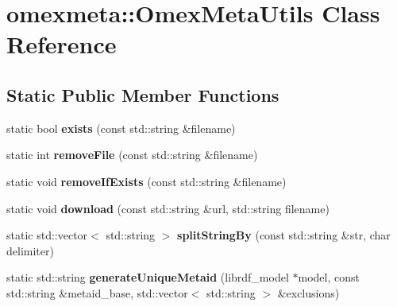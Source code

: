 \hypertarget{classomexmeta_1_1OmexMetaUtils}{}\section{omexmeta\+:\+:Omex\+Meta\+Utils Class Reference}
\label{classomexmeta_1_1OmexMetaUtils}
\subsection*{Static Public Member Functions}
\begin{DoxyCompactItemize}
\item 
\mbox{\label{classomexmeta_1_1OmexMetaUtils_ab72b362607e6bbdd0025eefa574cd073}} 
static bool {\bfseries exists} (const std\+::string \&filename)
\item 
\mbox{\label{classomexmeta_1_1OmexMetaUtils_a9c445a8e0cc6589b25d6fa630686c171}} 
static int {\bfseries remove\+File} (const std\+::string \&filename)
\item 
\mbox{\label{classomexmeta_1_1OmexMetaUtils_a8e629136cb2685ed839ea3a0e88094e6}} 
static void {\bfseries remove\+If\+Exists} (const std\+::string \&filename)
\item 
\mbox{\label{classomexmeta_1_1OmexMetaUtils_a046b603d6308242b70b55de6cb72325c}} 
static void {\bfseries download} (const std\+::string \&url, std\+::string filename)
\item 
\mbox{\label{classomexmeta_1_1OmexMetaUtils_aac769ce6e901f32820cd7dc3fef989fa}} 
static std\+::vector$<$ std\+::string $>$ {\bfseries split\+String\+By} (const std\+::string \&str, char delimiter)
\item 
\mbox{\label{classomexmeta_1_1OmexMetaUtils_a4700231d455a5f65f7cc290d98d2b0ec}} 
static std\+::string {\bfseries generate\+Unique\+Metaid} (librdf\+\_\+model $\ast$model, const std\+::string \&metaid\+\_\+base, std\+::vector$<$ std\+::string $>$ \&exclusions)
\item 
\mbox{\label{classomexmeta_1_1OmexMetaUtils_a6694715cf3f5dccd33d416ecc84ff375}} 

\end{DoxyCompactItemize}
